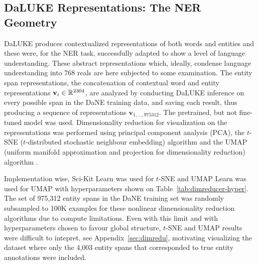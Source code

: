 \documentclass[main.tex]{subfiles}
\begin{document}
\subsection{DaLUKE Representations: The NER Geometry}
DaLUKE produces contextualized representations of both words and entities and these were, for the NER task, successfully adapted to show a level of language understanding.
These abstract representations which, ideally, condense language understanding into 768 reals are here subjected to some examination.
The entity span representations, the concatenation of contextual word and entity representations $\mathbf v_i \in \mathbb R^{2304}$, are analyzed by conducting DaLUKE inference on every possible span in the DaNE training data, and saving each result, thus producing a sequence of representations $\mathbf v_{1, \ldots, 975312}$.
The pretrained, but not fine-tuned model was used.
Dimensionality reduction for visualization on the representations was performed using principal component analysis (PCA), the $t$-SNE ($t$-distributed stochastic neighbour embedding) algorithm \cite{maaten2008tsne} and the UMAP (uniform manifold approximation and projection for dimensionality reduction) algorithm \cite{mcinnes2020umap}.

Implementation wise, Sci-Kit Learn was used for $t$-SNE \cite{pedregosa2011scikit} and UMAP Learn was used for UMAP \cite{mcinnes2018umap-software} with hyperparameters shown on Table~\ref{tab:dimreducer-hyper}.
The set of 975,312 entity spans in the DaNE training set was randomly subsampled to 100K examples for these nonlinear dimensionality reduction algorithms due to compute limitations.
Even with this limit and with hyperparameters chosen to favour global structure, $t$-SNE and UMAP results were difficult to intepret, see Appendix~\ref{sec:dimredu}, motivating visualizing the dataset where only the 4,003 entity spans that corresponded to true entity annotations were included.
\end{document}
